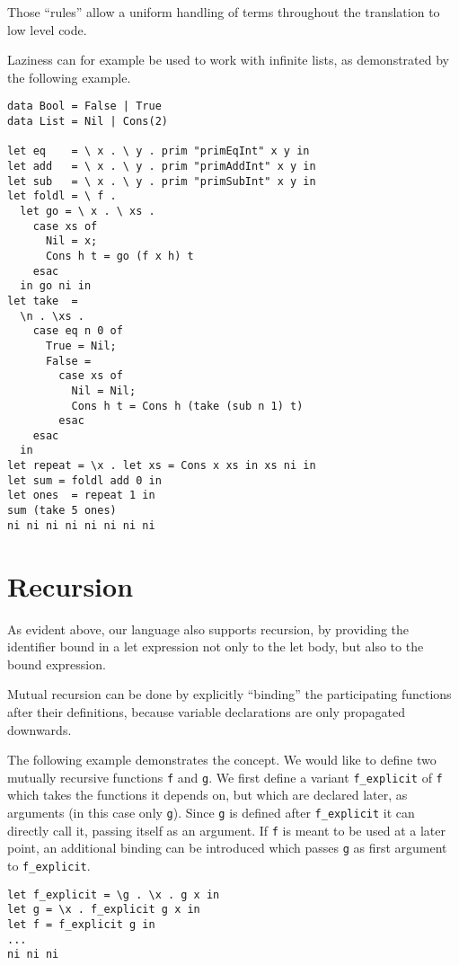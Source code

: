\documentclass{scrartcl}
\begin{document}
Those ``rules'' allow a uniform handling of terms throughout the translation to low level code.

Laziness can for example be used to work with infinite lists, as demonstrated by the following example.

\begin{lstlisting}
data Bool = False | True
data List = Nil | Cons(2)

let eq    = \ x . \ y . prim "primEqInt" x y in
let add   = \ x . \ y . prim "primAddInt" x y in
let sub   = \ x . \ y . prim "primSubInt" x y in
let foldl = \ f .
  let go = \ x . \ xs .
    case xs of
      Nil = x;
      Cons h t = go (f x h) t
    esac
  in go ni in
let take  = 
  \n . \xs .
    case eq n 0 of
      True = Nil;
      False = 
        case xs of
          Nil = Nil;
          Cons h t = Cons h (take (sub n 1) t)
        esac
    esac
  in
let repeat = \x . let xs = Cons x xs in xs ni in
let sum = foldl add 0 in
let ones  = repeat 1 in
sum (take 5 ones)
ni ni ni ni ni ni ni ni
\end{lstlisting}

\section{Recursion}

As evident above, our language also supports recursion, by providing the identifier bound in a let expression not only to the let body, but also to the bound expression.

Mutual recursion can be done by explicitly ``binding'' the participating functions after their definitions, because variable declarations are only propagated downwards.

The following example demonstrates the concept. We would like to define two mutually recursive functions \texttt{f} and \texttt{g}.
We first define a variant \texttt{f\_explicit} of \texttt{f} which takes the functions it depends on, but which are declared later, as arguments (in this case only \texttt{g}).
Since \texttt{g} is defined after \texttt{f\_explicit} it can directly call it, passing itself as an argument.
If \texttt{f} is meant to be used at a later point, an additional binding can be introduced which passes \texttt{g} as first argument to \texttt{f\_explicit}.

\begin{lstlisting}
let f_explicit = \g . \x . g x in
let g = \x . f_explicit g x in
let f = f_explicit g in
...
ni ni ni
\end{lstlisting}
\end{document}
